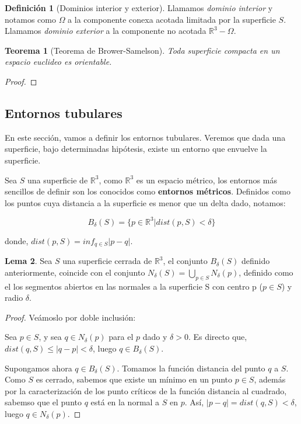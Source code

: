 \documentclass[paper=a4, fontsize=11pt, spanish]{scrartcl}
\newcommand{\rtres}{\mathbb{R}^3}
\newtheorem{theorem}{Teorema}[section]
\theoremstyle{definition}
\newtheorem{lemma}[theorem]{Lema}
\theoremstyle{definition}
\newtheorem{definition}{Definición}
\theoremstyle{definition}
\begin{document}
\begin{definition}[Dominios interior y exterior]
Llamamos \textit{dominio interior} y notamos como $\Omega$ a la componente conexa acotada limitada por la superficie $S$. Llamamos \textit{dominio exterior} a la componente no acotada $\rtres - \Omega$.
\end{definition}

\begin{theorem}[Teorema de Brower-Samelson]
Toda superficie compacta en un espacio euclideo es orientable.
\end{theorem}
\begin{proof}

\end{proof}

\subsection{Entornos tubulares}

En este sección, vamos a definir los entornos tubulares. Veremos que dada una superficie, bajo determinadas hipótesis, existe un entorno que envuelve la superficie.

Sea $S$ una superficie de $\rtres$, como $\rtres$ es un espacio métrico, los entornos más sencillos de definir son los conocidos como \textbf{entornos métricos}. Definidos como los puntos cuya distancia a la superficie es menor que un delta dado, notamos:

\begin{equation*}
    B_\delta(S)=\{p\in \rtres | dist(p,S) < \delta\}
\end{equation*}

donde, $dist(p,S) = inf_{q\in S}|p-q|$.

\begin{lemma}
Sea $S$ una superficie cerrada de $\rtres$, el conjunto $B_\delta(S)$ definido anteriormente, coincide con el conjunto $N_\delta(S)=\bigcup_{p\in S}N_\delta(p)$, definido como el los segmentos abiertos en las normales a la superficie S con centro p ($p \in S$) y radio $\delta$.
\end{lemma}
\begin{proof}
Veámoslo por doble inclusión:

Sea $p \in S$, y sea $q \in N_\delta(p)$ para el $p$ dado y $\delta > 0$. Es directo que, $dist(q,S) \leq |q-p| < \delta$, luego $q \in B_\delta(S)$.

Supongamos ahora $q \in B_\delta(S)$. Tomamos la función distancia del punto $q$ a $S$. Como $S$ es cerrado, sabemos que existe un mínimo en un punto $p \in S$, además por la caracterización de los punto críticos de la función distancia al cuadrado, sabemso que el punto $q$ está en la normal a $S$ en $p$. Así, $|p-q| = dist(q,S) < \delta$, luego $q \in N_\delta(p)$.
\end{proof}
\end{document}
